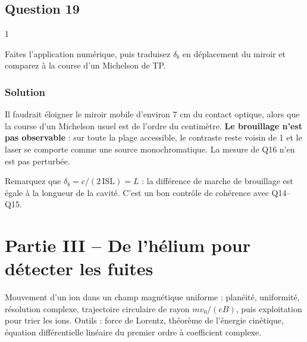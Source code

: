 \documentclass[11pt,a4paper]{article}
\newcommand{\equationajustee}[1]{%
  \sbox{\boiteequation}{$\displaystyle #1$}%
  \ifdim\wd\boiteequation>\linewidth
    \[\resizebox{\linewidth}{!}{\usebox{\boiteequation}}\]%
  \else
    \[#1\]%
  \fi}
\begin{document}
\hypertarget{question-19}{%
\subsection{Question 19}\label{question-19}}

\begin{indication}{1}

Faites l'application numérique, puis traduisez \(\delta_b\) en déplacement du miroir et comparez à la course d'un Michelson de TP.

\end{indication}

\hypertarget{solution-18}{%
\subsubsection{Solution}\label{solution-18}}

\equationajustee{\delta_b=\frac{3{,}0\cdot10^8}{2\times1{,}1\cdot10^9}\ \mathrm m\approx\boxed{0{,}14\ \mathrm m}}

Il faudrait éloigner le miroir mobile d'environ 7 cm du contact optique, alors que la course d'un Michelson usuel est de l'ordre du centimètre. \textbf{Le brouillage n'est pas observable} : sur toute la plage accessible, le contraste reste voisin de 1 et le laser se comporte comme une source monochromatique. La mesure de Q16 n'en est pas perturbée.

\begin{piege}

Remarquez que \(\delta_b=c/(2\,\mathrm{ISL})=L\) : la différence de marche de brouillage est égale à la longueur de la cavité. C'est un bon contrôle de cohérence avec Q14--Q15.

\end{piege}

\hypertarget{partie-iii-de-lhuxe9lium-pour-duxe9tecter-les-fuites}{%
\section{Partie III -- De l'hélium pour détecter les fuites}\label{partie-iii-de-lhuxe9lium-pour-duxe9tecter-les-fuites}}

Mouvement d'un ion dans un champ magnétique uniforme : planéité, uniformité, résolution complexe, trajectoire circulaire de rayon \(mv_0/(eB)\), puis exploitation pour trier les ions. Outils : force de Lorentz, théorème de l'énergie cinétique, équation différentielle linéaire du premier ordre à coefficient complexe.
\end{document}
